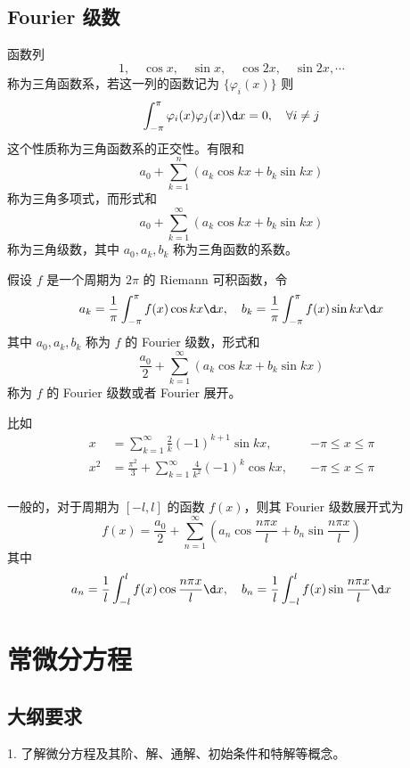 \subsection{Fourier 级数}

函数列
\[ 1, \quad \cos x, \quad \sin x, \quad \cos 2x, \quad \sin 2x , \cdots \]
称为三角函数系，若这一列的函数记为 $\{\varphi_i(x)\}$ 则
\[ \int_{-\pi}^{\pi} \varphi_i(x) \varphi_j(x) \d x = 0, \quad \forall i \neq j \]
这个性质称为三角函数系的正交性。有限和
\[ a_0 + \sum_{k=1}^n (a_k \cos kx + b_k \sin kx) \]
称为三角多项式，而形式和
\[ a_0 + \sum_{k=1}^\infty (a_k \cos kx + b_k \sin kx) \]
称为三角级数，其中 $a_0, a_k, b_k$ 称为三角函数的系数。

\begin{definition}[Fourier 级数]
	假设 $f$ 是一个周期为 $2\pi$ 的 Riemann 可积函数，令
	\[ a_k = \frac{1}{\pi} \int_{-\pi}^{\pi} f(x) \cos kx \d x, \quad b_k = \frac{1}{\pi} \int_{-\pi}^{\pi} f(x) \sin k x \d x \]
	其中 $a_0, a_k, b_k$ 称为 $f$ 的 Fourier 级数，形式和
	\[ \frac{a_0}{2} + \sum_{k=1}^\infty (a_k \cos k x+ b_k \sin k x) \]
	称为 $f$ 的 Fourier 级数或者 Fourier 展开。
\end{definition}

比如
\[ \begin{aligned}
		x   & = \sum_{k=1}^{\infty} \frac{2}{k} (-1)^{k+1} \sin k x, \quad                   & -\pi \leqslant x \leqslant \pi \\
		x^2 & = \frac{\pi^2}{3} + \sum_{k=1}^{\infty} \frac{4}{k^2} (-1)^{k} \cos k x, \quad & -\pi \leqslant x \leqslant \pi \\
	\end{aligned} \]

一般的，对于周期为 $[-l,l]$ 的函数 $f(x)$，则其 Fourier 级数展开式为
\[ f(x) = \frac{a_0}{2} + \sum_{n=1}^{\infty} \left( a_n \cos \frac{n \pi x}{l} + b_n \sin \frac{n \pi x}{l} \right) \]
其中
\[ a_n = \frac{1}{l} \int_{-l}^{l} f(x) \cos \frac{n \pi x}{l} \d x, \quad b_n = \frac{1}{l} \int_{-l}^{l} f(x) \sin \frac{n \pi x}{l} \d x  \]


\section{常微分方程}

\subsection{大纲要求}

1. 了解微分方程及其阶、解、通解、初始条件和特解等概念。


